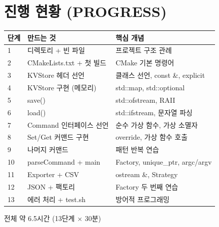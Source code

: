 \documentclass[11pt,a4paper]{article}
\begin{document}
\newpage

\section{진행 현황 (PROGRESS)}

\begin{longtable}{p{1cm}p{5cm}p{6cm}}
\toprule
단계 & 만드는 것 & 핵심 개념 \\
\midrule
1 & 디렉토리 + 빈 파일 & 프로젝트 구조 관례 \\
2 & CMakeLists.txt + 첫 빌드 & CMake 기본 명령어 \\
3 & KVStore 헤더 선언 & 클래스 선언, const \&, explicit \\
4 & KVStore 구현 (메모리) & std::map, std::optional \\
5 & save() & std::ofstream, RAII \\
6 & load() & std::ifstream, 문자열 파싱 \\
7 & Command 인터페이스 선언 & 순수 가상 함수, 가상 소멸자 \\
8 & Set/Get 커맨드 구현 & override, 가상 함수 호출 \\
9 & 나머지 커맨드 & 패턴 반복 연습 \\
10 & parseCommand + main & Factory, unique\_ptr, argc/argv \\
11 & Exporter + CSV & ostream \&, Strategy \\
12 & JSON + 팩토리 & Factory 두 번째 연습 \\
13 & 에러 처리 + test.sh & 방어적 프로그래밍 \\
\bottomrule
\end{longtable}

전체 약 6.5시간 (13단계 $\times$ 30분)
\end{document}
